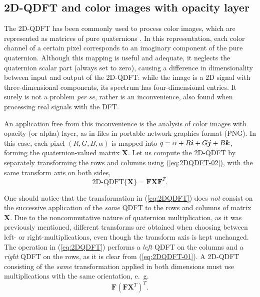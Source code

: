 \subsection{2D-QDFT and color images with opacity layer}
\label{subsec:2D_QDFT}
The 2D-QDFT has been commonly used to process color images, which are represented as matrices of pure quaternions \cite{lu20072d,ell2006hypercomplex,chen2018multiple}. In this representation, each color channel of a certain pixel corresponds to an imaginary component of the pure quaternion. Although this mapping is useful and adequate, it neglects the quaternion scalar part (always set to zero), causing a difference in dimensionality between input and output of the 2D-QDFT: while the image is a 2D signal with three-dimensional components, its spectrum has four-dimensional entries. It surely is not a problem \textit{per se}, rather is an inconvenience, also found when processing real signals with the DFT.

An application free from this inconvenience is the analysis of color images with opacity (or alpha) layer, as in files in portable network graphics format (PNG). In this case, each pixel $ (R,G,B,\alpha) $ is mapped into $ q = \alpha + R \boldsymbol{i} + G \boldsymbol{j} + B \boldsymbol{k} $, forming the quaternion-valued matrix $ \mathbf{X} $. Let us compute the 2D-QDFT by separately transforming the rows and columns using (\ref{eq:2DQDFT-02}), with the same transform axis on both sides,
\begin{equation}
\label{eq:2DQDFT}
\text{2D-QDFT}\{\mathbf{X} \} = \mathbf{F} \mathbf{X} \mathbf{F}^T.
\end{equation}

One should notice that the transformation in (\ref{eq:2DQDFT}) does \textit{not} consist on the successive application of the \textit{same} QDFT to the rows and columns of matrix $ \mathbf{X} $. Due to the noncommutative nature of quaternion multiplication, as it was previously mentioned, different transforms are obtained when choosing between left- or right-multiplications, even though the transform axis is kept unchanged. The operation in (\ref{eq:2DQDFT}) performs a \textit{left} QDFT on the columns and a \textit{right} QDFT on the rows, as it is clear from (\ref{eq:2DQDFT-01}). A 2D-QDFT consisting of the \textit{same} transformation applied in both dimensions must use multiplications with the same orientation, e.~g.
\begin{equation}
\label{eq:2DQDFTv2}
\mathbf{F} \left( \mathbf{F}\mathbf{X}^T \right)^T.
\end{equation}

